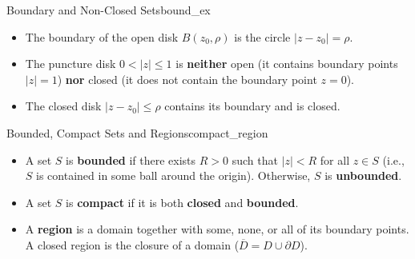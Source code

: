 \begin{example}{Boundary and Non-Closed Sets}{bound_ex}
\begin{itemize}
    \item The boundary of the open disk $B(z_0, \rho)$ is the circle $|z - z_0| = \rho$.
    \item The puncture disk $0 < |z| \le 1$ is \textbf{neither} open (it contains boundary points $|z|=1$) \textbf{nor} closed (it does not contain the boundary point $z = 0$).
    \item The closed disk $|z - z_0| \le \rho$ contains its boundary and is closed.
\end{itemize}
\end{example}

\begin{definition}{Bounded, Compact Sets and Regions}{compact_region}
\begin{itemize}
    \item A set $S$ is \textbf{bounded} if there exists $R > 0$ such that $|z| < R$ for all $z \in S$ (i.e., $S$ is contained in some ball around the origin). Otherwise, $S$ is \textbf{unbounded}.
    \item A set $S$ is \textbf{compact} if it is both \textbf{closed} and \textbf{bounded}.
    \item A \textbf{region} is a domain together with some, none, or all of its boundary points. A closed region is the closure of a domain ($\overline{D} = D \cup \partial D$).
\end{itemize}
\end{definition}
